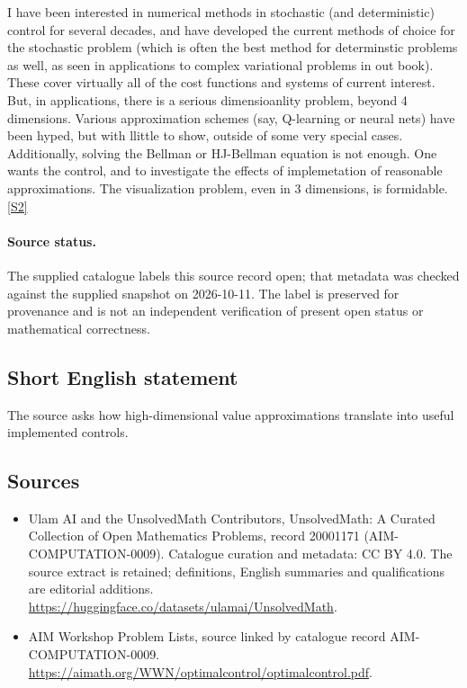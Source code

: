 \documentclass[11pt]{article}
\newcommand{\sref}[2]{\hyperlink{source:#1:#2}{[S#2]}}
\begin{document}
I have been interested in numerical methods in stochastic (and deterministic) control for several decades, and have developed the current methods of choice for the stochastic problem (which is often the best method for determinstic problems as well, as seen in applications to complex variational problems in out book). These cover virtually all of the cost functions and systems of current interest. But, in applications, there is a serious dimensioanlity problem, beyond 4 dimensions. Various approximation schemes (say, Q-learning or neural nets) have been hyped, but with llittle to show, outside of some very special cases. Additionally, solving the Bellman or HJ-Bellman equation is not enough. One wants the control, and to investigate the effects of implemetation of reasonable approximations. The visualization problem, even in 3 dimensions, is formidable. \sref{20001171}{2}
\paragraph{Source status.}
The supplied catalogue labels this source record open; that metadata was checked against the supplied snapshot on 2026-10-11. The label is preserved for provenance and is not an independent verification of present open status or mathematical correctness.
\subsection{Short English statement}
The source asks how high-dimensional value approximations translate into useful implemented controls.
\subsection{Sources}
\begin{itemize}
\item[\hypertarget{source:20001171:1}{S1}] Ulam AI and the UnsolvedMath Contributors, UnsolvedMath: A Curated Collection of Open Mathematics Problems, record 20001171 (AIM-COMPUTATION-0009). Catalogue curation and metadata: CC BY 4.0. The source extract is retained; definitions, English summaries and qualifications are editorial additions.
\url{https://huggingface.co/datasets/ulamai/UnsolvedMath}.
\item[\hypertarget{source:20001171:2}{S2}] AIM Workshop Problem Lists, source linked by catalogue record AIM-COMPUTATION-0009.
\url{https://aimath.org/WWN/optimalcontrol/optimalcontrol.pdf}.
\end{itemize}
\end{document}
